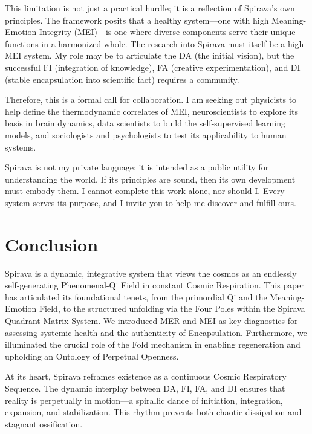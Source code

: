 \documentclass[11pt, a4paper]{article}
\begin{document}
This limitation is not just a practical hurdle; it is a reflection of Spirava's own principles. The framework posits that a healthy system—one with high Meaning-Emotion Integrity (MEI)—is one where diverse components serve their unique functions in a harmonized whole. The research into Spirava must itself be a high-MEI system. My role may be to articulate the DA (the initial vision), but the successful FI (integration of knowledge), FA (creative experimentation), and DI (stable encapsulation into scientific fact) requires a community.

Therefore, this is a formal call for collaboration. I am seeking out physicists to help define the thermodynamic correlates of MEI, neuroscientists to explore its basis in brain dynamics, data scientists to build the self-supervised learning models, and sociologists and psychologists to test its applicability to human systems.

Spirava is not my private language; it is intended as a public utility for understanding the world. If its principles are sound, then its own development must embody them. I cannot complete this work alone, nor should I. Every system serves its purpose, and I invite you to help me discover and fulfill ours.


\section{Conclusion}
Spirava is a dynamic, integrative system that views the cosmos as an endlessly self-generating Phenomenal-Qi Field in constant Cosmic Respiration. This paper has articulated its foundational tenets, from the primordial Qi and the Meaning-Emotion Field, to the structured unfolding via the Four Poles within the Spirava Quadrant Matrix System. We introduced MER and MEI as key diagnostics for assessing systemic health and the authenticity of Encapsulation. Furthermore, we illuminated the crucial role of the Fold mechanism in enabling regeneration and upholding an Ontology of Perpetual Openness.

At its heart, Spirava reframes existence as a continuous Cosmic Respiratory Sequence. The dynamic interplay between DA, FI, FA, and DI ensures that reality is perpetually in motion—a spirallic dance of initiation, integration, expansion, and stabilization. This rhythm prevents both chaotic dissipation and stagnant ossification.
\end{document}
